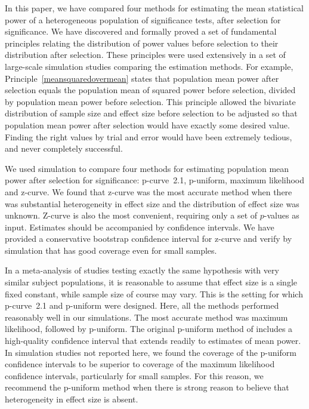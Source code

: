 \documentclass[jou]{apa6} %
\begin{document}
In this paper, we have compared four methods for estimating the mean statistical power of a heterogeneous population of significance tests, after selection for significance. We have discovered and formally proved a set of fundamental principles relating the distribution of power values before selection to their distribution after selection. These principles were used extensively in a set of large-scale simulation studies comparing the estimation methods. For example, Principle~\ref{meansquaredovermean} states that population mean power after selection equals the population mean of squared power before selection, divided by population mean power before selection. This principle allowed the bivariate distribution of sample size and effect size before selection to be adjusted so that population mean power after selection would have exactly some desired value. Finding the right values by trial and error would have been extremely tedious, and never completely successful.

We used simulation to compare four methods for estimating population mean power after selection for significance: p-curve~2.1, p-uniform, maximum likelihood and z-curve.  We found that z-curve was the most accurate method when there was substantial heterogeneity in effect size and the distribution of effect size was unknown. Z-curve is also the most convenient, requiring only a set of $p$-values as input. Estimates should be accompanied by confidence intervals. We have provided a conservative bootstrap confidence interval for z-curve and verify by simulation that has good coverage even for small samples.

In a meta-analysis of studies testing exactly the same hypothesis with very similar subject populations, it is reasonable to assume that effect size is a single fixed constant, while sample size of course may vary. This is the setting for which p-curve~2.1 and p-uniform were designed. Here, all the methods performed reasonably well in our simulations. The most accurate method was maximum likelihood, followed by p-uniform. The original p-uniform method of \textcite{vanAssenEtAl2014} includes a high-quality confidence interval that extends readily to estimates of mean power. In simulation studies not reported here, we found the coverage of the p-uniform confidence intervals to be superior to coverage of the maximum likelihood confidence intervals, particularly for small samples. For this reason, we recommend the p-uniform method when there is strong reason to believe that heterogeneity in effect size is absent.
\end{document}
